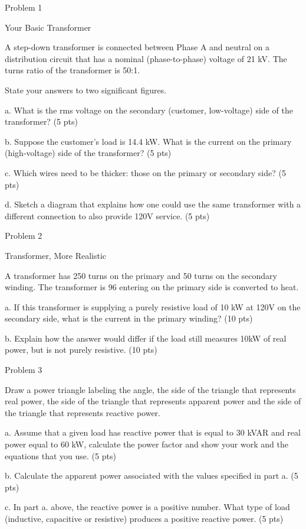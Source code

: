 \documentclass{article}
\begin{document}
 Problem 1

Your Basic Transformer

A step-down transformer is connected between Phase A and neutral on a
distribution circuit that has a nominal (phase-to-phase) voltage of 21
kV.  The turns ratio of the transformer is 50:1.

State your answers to two significant figures.

a. What is the rms voltage on the secondary (customer, low-voltage)
side of the transformer? (5 pts)

b. Suppose the customer's load is 14.4 kW.  What is the current on the
primary (high-voltage) side of the transformer? (5 pts)

c. Which wires need to be thicker: those on the primary or secondary
side? (5 pts)

d. Sketch a diagram that explains how one could use the same transformer
with a different connection to also provide 120V service. (5 pts)

 Problem 2

Transformer, More Realistic

A transformer has 250 turns on the primary and 50 turns on the secondary
winding.  The transformer is 96%
entering on the primary side is converted to heat.

a. If this transformer is supplying a purely resistive load of 10 kW at
120V on the secondary side, what is the current in the primary winding?
(10 pts)

b. Explain how the answer would differ if the load still measures 10kW of
real power, but is not purely resistive. (10 pts)

 Problem 3

Draw a power triangle labeling the angle, the side of the triangle
that represents real power, the side of the triangle that represents
apparent power and the side of the triangle that represents reactive
power.

a. Assume that a given load has reactive power that is equal to 30 kVAR
and real power equal to 60 kW, calculate the power factor and show your
work and the equations that you use. (5 pts)

b. Calculate the apparent power associated with the values specified in
part a. (5 pts)

c. In part a. above, the reactive power is a positive number.  What type
of load (inductive, capacitive or resistive) produces a positive
reactive power. (5 pts)
\end{document}
